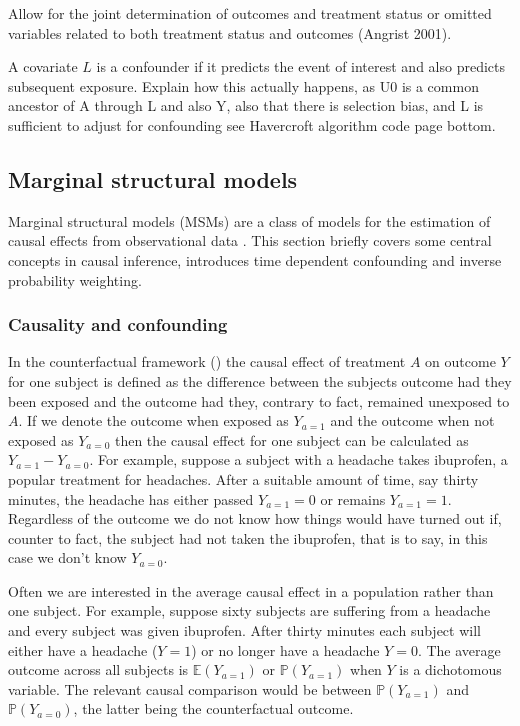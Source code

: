 \documentclass[11pt]{article}
\begin{document}
    Allow for the joint determination of outcomes and treatment status or
omitted variables related to both treatment status and outcomes (Angrist
2001).

A covariate \(L\) is a confounder if it predicts the event of interest
and also predicts subsequent exposure. Explain how this actually
happens, as U0 is a common ancestor of A through L and also Y, also that
there is selection bias, and L is sufficient to adjust for confounding
see Havercroft algorithm code page bottom.

    \subsection{Marginal structural
models}\label{marginal-structural-models}

Marginal structural models (MSMs) are a class of models for the
estimation of causal effects from observational data \citet{Robins2000}.
This section briefly covers some central concepts in causal inference,
introduces time dependent confounding and inverse probability weighting.

    \subsubsection{Causality and
confounding}\label{causality-and-confounding}

In the counterfactual framework
(\citet{Neyman1923, Rubin1978, Robins1986}) the causal effect of
treatment \(A\) on outcome \(Y\) for one subject is defined as the
difference between the subjects outcome had they been exposed and the
outcome had they, contrary to fact, remained unexposed to \(A\). If we
denote the outcome when exposed as \(Y_{a=1}\) and the outcome when not
exposed as \(Y_{a=0}\) then the causal effect for one subject can be
calculated as \(Y_{a=1} - Y_{a=0}\). For example, suppose a subject with
a headache takes ibuprofen, a popular treatment for headaches. After a
suitable amount of time, say thirty minutes, the headache has either
passed \(Y_{a=1} = 0\) or remains \(Y_{a=1} = 1\). Regardless of the
outcome we do not know how things would have turned out if, counter to
fact, the subject had not taken the ibuprofen, that is to say, in this
case we don't know \(Y_{a=0}\).

Often we are interested in the average causal effect in a population
rather than one subject. For example, suppose sixty subjects are
suffering from a headache and every subject was given ibuprofen. After
thirty minutes each subject will either have a headache (\(Y = 1\)) or
no longer have a headache \(Y = 0\). The average outcome across all
subjects is \(\mathbb{E}(Y_{a = 1})\) or \(\mathbb{P}(Y_{a = 1})\) when
\(Y\) is a dichotomous variable. The relevant causal comparison would be
between \(\mathbb{P}(Y_{a = 1})\) and \(\mathbb{P}(Y_{a = 0})\), the
latter being the counterfactual outcome.
\end{document}
